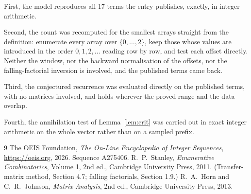 \documentclass[11pt,a4paper]{article}
\theoremstyle{plain}
\theoremstyle{definition}
\begin{document}
First, the model reproduces all $17$ terms the entry publishes, exactly, in integer
arithmetic.

Second, the count was recomputed for the smallest arrays straight from the definition:
enumerate every array over $\{0,\dots,2\}$, keep those whose values are introduced in the
order $0,1,2,\dots$ reading row by row, and test each offset directly. Neither the window, nor
the backward normalisation of the offsets, nor the falling-factorial inversion is involved, and
the published terms came back.

Third, the conjectured recurrence was evaluated directly on the published terms, with no
matrices involved, and holds wherever the proved range and the data overlap.

Fourth, the annihilation test of Lemma~\ref{lem:crit} was carried out in exact integer
arithmetic on the whole vector rather than on a sampled prefix.

\begin{thebibliography}{9}
 The OEIS Foundation, \emph{The On-Line Encyclopedia of Integer
Sequences}, \url{https://oeis.org}, 2026. Sequence A275406.
 R.~P.~Stanley, \emph{Enumerative Combinatorics}, Volume 1, 2nd ed.,
Cambridge University Press, 2011. (Transfer-matrix method, Section 4.7; falling factorials,
Section 1.9.)
 R.~A.~Horn and C.~R.~Johnson, \emph{Matrix Analysis}, 2nd ed., Cambridge
University Press, 2013.
\end{thebibliography}
\end{document}

